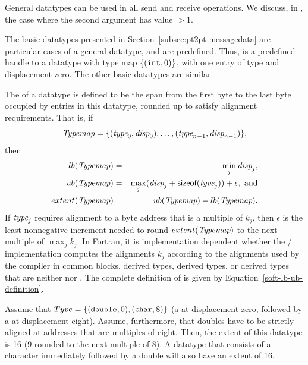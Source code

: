 General datatypes can be used in all send and receive
operations.  We discuss, in , the
case where the second argument  has value $> 1$.

The basic datatypes presented in
Section~\ref{subsec:pt2pt-messagedata}
are particular cases of a general datatype, and are predefined.
Thus,  is a predefined handle to a datatype with type
map $\{ (\ctype{int}, 0) \}$, with one entry of type  and
displacement zero.  The other basic datatypes are similar.

The  of a datatype is defined to
be the span from the first byte to the last byte occupied by entries in this
datatype, rounded up to satisfy alignment requirements.
That is, if
\[
\textrm{\itshape{Typemap}} = \{ (\textrm{\itshape{type}}_0,\textrm{\itshape{disp}}_0), \ldots , (\textrm{\itshape{type}}_{n-1}, \textrm{\itshape{disp}}_{n-1}) \} ,
\]
then
\begin{eqnarray}
lb(\textrm{\itshape{Typemap}}) & = & \min_j \textrm{\itshape{disp}}_j , \nonumber \\
ub(\textrm{\itshape{Typemap}}) & = & \max_j (\textrm{\itshape{disp}}_j + \textsf{sizeof}(\textrm{\itshape{type}}_j)) + \epsilon , \mbox{ and}
\nonumber \\ extent(\textrm{\itshape{Typemap}}) & = & ub(\textrm{\itshape{Typemap}}) - lb(\textrm{\itshape{Typemap}}).
\label{soft-lb-ub-definition}
\end{eqnarray}
If $\textrm{\itshape{type}}_j$ requires alignment to a byte address that
is
a multiple
of $k_j$,
then $\epsilon$ is the least nonnegative increment needed to round
$extent(\textrm{\itshape{Typemap}})$ to the next multiple of $\max_j k_j$.
In Fortran, it is implementation dependent whether the \MPI/ implementation
computes the alignments $k_j$ according to the alignments
used by the compiler in common blocks,  derived types,
 derived types,
or derived types that are neither  nor .
The complete definition of  is given
by Equation~\ref{soft-lb-ub-definition}.


\begin{example}
\label{pt2pt-exR}
%
%
Assume that
$Type = \{ (\ctype{double},0), (\ctype{char}, 8) \}$
(a  at
displacement zero, followed by a  at displacement eight).
Assume, furthermore, that
doubles have to be strictly aligned at addresses that are multiples of eight.
Then, the extent of this datatype is 16 (9 rounded to the next multiple of 8).
A datatype that consists of a character immediately followed by a double will
also have an extent of 16.
\end{example}


